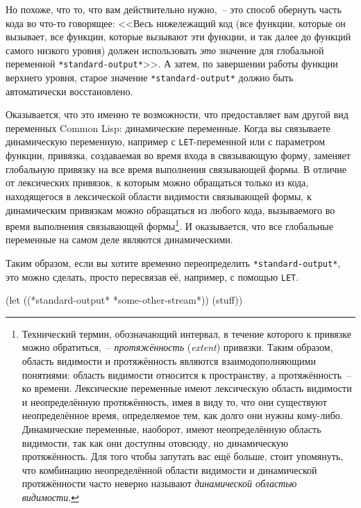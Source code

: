 Но похоже, что то, что вам действительно нужно,~-- это способ обернуть часть кода во что-то
говорящее: <<Весь нижележащий код (все функции, которые он вызывает, все функции, которые
вызывают эти функции, и так далее до функций самого низкого уровня) должен использовать
\textit{это} значение для глобальной переменной \lstinline{*standard-output*}>>. А затем, по завершении
работы функции верхнего уровня, старое значение \lstinline{*standard-output*} должно быть
автоматически восстановлено.

Оказывается, что это именно те возможности, что предоставляет вам другой вид переменных
Common Lisp: динамические переменные. Когда вы связываете динамическую переменную,
например с \lstinline{LET}-переменной или с параметром функции, привязка, создаваемая во
время входа в связывающую форму, заменяет глобальную привязку на все время выполнения
связывающей формы. В отличие от лексических привязок, к которым можно обращаться только из
кода, находящегося в лексической области видимости связывающей формы, к динамическим
привязкам можно обращаться из любого кода, вызываемого во время выполнения связывающей
формы\footnote{Технический термин, обозначающий интервал, в течение которого к привязке
  можно обратиться,~-- \textit{протяжённость} (\textit{extent}) привязки. Таким образом,
  область видимости и протяжённость являются взаимодополняющими понятиями: область
  видимости относится к пространству, а протяжённость~-- ко времени. Лексические
  переменные имеют лексическую область видимости и неопределённую протяжённость, имея
  в виду то, что они существуют неопределённое время, определяемое тем, как долго они нужны
  кому-либо. Динамические переменные, наоборот, имеют неопределённую область видимости,
  так как они доступны отовсюду, но динамическую протяжённость. Для того чтобы запутать
  вас ещё больше, стоит упомянуть, что комбинацию неопределённой области видимости и
  динамической протяжённости часто неверно называют \textit{динамической областью
    видимости}.}. И оказывается, что все глобальные переменные на самом деле являются
динамическими.

Таким образом, если вы хотите временно переопределить \lstinline{*standard-output*}, это можно
сделать, просто пересвязав её, например, с помощью \lstinline{LET}.

\begin{myverb}
(let ((*standard-output* *some-other-stream*))
  (stuff))
\end{myverb}

